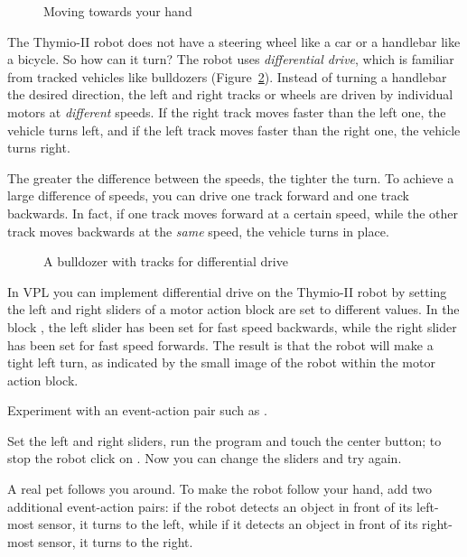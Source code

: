 \begin{figure}
\begin{center}
\caption{Moving towards your hand}\label{fig.follow-hand}
\end{center}
\end{figure}



The Thymio-II robot does not have a steering wheel like a car or a
handlebar like a bicycle. So how can it turn? The robot uses
\emph{differential drive}, which is familiar from tracked vehicles like
bulldozers (Figure~\ref{fig.bull}). Instead of turning a handlebar the
desired direction, the left and right tracks or wheels are driven by
individual motors at \emph{different} speeds. If the right track moves
faster than the left one, the vehicle turns left, and if the left track
moves faster than the right one, the vehicle turns right.

The greater the difference between the speeds, the tighter the turn. To
achieve a large difference of speeds, you can drive one track forward
and one track backwards. In fact, if one track moves forward at a
certain speed, while the other track moves backwards at the \emph{same}
speed, the vehicle turns in place.

\begin{figure}
\begin{center}
\caption{A bulldozer with tracks for differential drive}\label{fig.bull}
\end{center}
\end{figure}

In VPL you can implement differential drive on the Thymio-II robot by
setting the left and right sliders of a motor action block are set to
different values. In the block , the left slider has
been set for fast speed backwards, while the right slider has been set
for fast speed forwards. The result is that the robot will make a tight
left turn, as indicated by the small image of the robot within the motor
action block.

Experiment with an event-action pair such as .

Set the left and right sliders, run the program
and touch the center button; to stop the robot click on .
Now you can change the sliders and try again.



A real pet follows you around. To make the robot follow your hand, add
two additional event-action pairs: if the robot detects an object in
front of its left-most sensor, it turns to the left, while if it detects
an object in front of its right-most sensor, it turns to the right.

